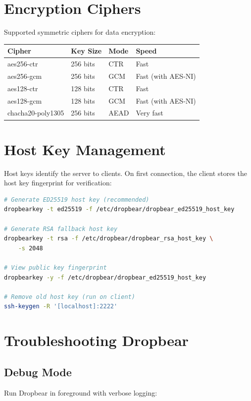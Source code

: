 \section{Encryption Ciphers}

Supported symmetric ciphers for data encryption:

\begin{longtable}{|p{4cm}|p{3cm}|p{3cm}|p{2cm}|}
\hline
\textbf{Cipher} & \textbf{Key Size} & \textbf{Mode} & \textbf{Speed} \\
\hline
aes256-ctr & 256 bits & CTR & Fast \\
aes256-gcm & 256 bits & GCM & Fast (with AES-NI) \\
aes128-ctr & 128 bits & CTR & Fast \\
aes128-gcm & 128 bits & GCM & Fast (with AES-NI) \\
chacha20-poly1305 & 256 bits & AEAD & Very fast \\
\hline
\end{longtable}

\section{Host Key Management}

Host keys identify the server to clients. On first connection, the client
stores the host key fingerprint for verification:

\begin{lstlisting}[language=bash]
# Generate ED25519 host key (recommended)
dropbearkey -t ed25519 -f /etc/dropbear/dropbear_ed25519_host_key

# Generate RSA fallback host key
dropbearkey -t rsa -f /etc/dropbear/dropbear_rsa_host_key \
    -s 2048

# View public key fingerprint
dropbearkey -y -f /etc/dropbear/dropbear_ed25519_host_key

# Remove old host key (run on client)
ssh-keygen -R '[localhost]:2222'
\end{lstlisting}

\section{Troubleshooting Dropbear}

\subsection{Debug Mode}

Run Dropbear in foreground with verbose logging:


